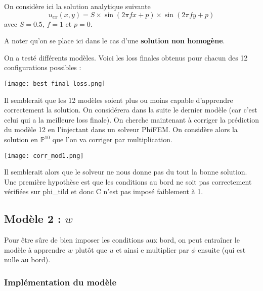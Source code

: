 On considère ici la solution analytique suivante
$$u_{ex}(x,y)=S\times\sin(2\pi fx+p)\times\sin(2\pi fy+p)$$
avec $S=0.5$, $f=1$ et $p=0$.

\begin{Rem}
	A noter qu'on se place ici dans le cas d'une \textbf{solution non homogène}.
\end{Rem}

On a testé différents modèles. Voici les loss finales obtenus pour chacun des 12 configurations possibles :

\begin{minipage}{\linewidth}
	\centering
	\texttt{[image: best\_final\_loss.png]}
\end{minipage}

Il semblerait que les 12 modèles soient plus ou moins capable d'apprendre correctement la solution. On considérera dans la suite le dernier modèle (car c'est celui qui a la meilleure loss finale). On cherche maintenant à corriger la prédiction du modèle 12 en l'injectant dans un solveur PhiFEM. On considère alors la solution en $\mathbb{P}^{10}$ que l'on va corriger par multiplication.

\begin{minipage}{\linewidth}
	\centering
	\texttt{[image: corr\_mod1.png]}
\end{minipage}

Il semblerait alors que le solveur ne nous donne pas du tout la bonne solution. Une première hypothèse est que les conditions au bord ne soit pas correctement vérifiées sur phi\_tild et donc C n'est pas imposé faiblement à 1.  

\newpage

\subsection{Modèle 2 : $w$}

Pour être sûre de bien imposer les conditions aux bord, on peut entraîner le modèle à apprendre $w$ plutôt que $u$ et ainsi e multiplier par $\phi$ ensuite (qui est nulle au bord). 

\subsubsection{Implémentation du modèle}


